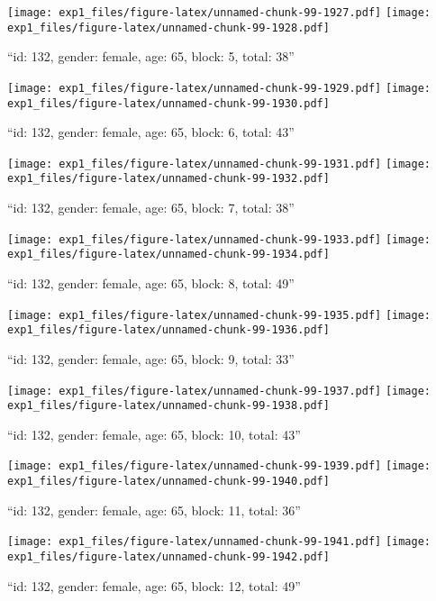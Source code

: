\documentclass[,]{article}
\begin{document}
\texttt{[image: exp1\_files/figure-latex/unnamed-chunk-99-1927.pdf]}
\texttt{[image: exp1\_files/figure-latex/unnamed-chunk-99-1928.pdf]}

\newpage
[1] 

``id: 132, gender: female, age: 65, block: 5, total: 38''

\texttt{[image: exp1\_files/figure-latex/unnamed-chunk-99-1929.pdf]}
\texttt{[image: exp1\_files/figure-latex/unnamed-chunk-99-1930.pdf]}

\newpage
[1] 

``id: 132, gender: female, age: 65, block: 6, total: 43''

\texttt{[image: exp1\_files/figure-latex/unnamed-chunk-99-1931.pdf]}
\texttt{[image: exp1\_files/figure-latex/unnamed-chunk-99-1932.pdf]}

\newpage
[1] 

``id: 132, gender: female, age: 65, block: 7, total: 38''

\texttt{[image: exp1\_files/figure-latex/unnamed-chunk-99-1933.pdf]}
\texttt{[image: exp1\_files/figure-latex/unnamed-chunk-99-1934.pdf]}

\newpage
[1] 

``id: 132, gender: female, age: 65, block: 8, total: 49''

\texttt{[image: exp1\_files/figure-latex/unnamed-chunk-99-1935.pdf]}
\texttt{[image: exp1\_files/figure-latex/unnamed-chunk-99-1936.pdf]}

\newpage
[1] 

``id: 132, gender: female, age: 65, block: 9, total: 33''

\texttt{[image: exp1\_files/figure-latex/unnamed-chunk-99-1937.pdf]}
\texttt{[image: exp1\_files/figure-latex/unnamed-chunk-99-1938.pdf]}

\newpage
[1] 

``id: 132, gender: female, age: 65, block: 10, total: 43''

\texttt{[image: exp1\_files/figure-latex/unnamed-chunk-99-1939.pdf]}
\texttt{[image: exp1\_files/figure-latex/unnamed-chunk-99-1940.pdf]}

\newpage
[1] 

``id: 132, gender: female, age: 65, block: 11, total: 36''

\texttt{[image: exp1\_files/figure-latex/unnamed-chunk-99-1941.pdf]}
\texttt{[image: exp1\_files/figure-latex/unnamed-chunk-99-1942.pdf]}

\newpage
[1] 

``id: 132, gender: female, age: 65, block: 12, total: 49''
\end{document}
